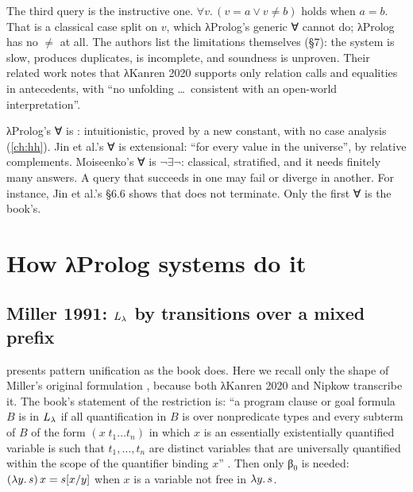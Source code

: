 \noindent The third query is the instructive one. $\forall v.\,(v=a\vee v\neq b)$ holds when $a=b$.
That is a classical case split on $v$, which λProlog's generic ∀ cannot do; λProlog has no $\neq$ at
all. The authors list the limitations themselves (§7): the system is slow, produces duplicates, is
incomplete, and soundness is unproven. Their related work notes that λKanren 2020 supports only
relation calls and equalities in antecedents, with \enquote{no unfolding \dots\ consistent with an
open-world interpretation}.

\begin{pitfall}
λProlog's ∀ is : intuitionistic, proved by a new constant, with no case analysis
(\cref{ch:hh}). Jin et al.'s ∀ is extensional: \enquote{for every value in the universe}, by relative
complements. Moiseenko's ∀ is $\neg\exists\neg$: classical, stratified, and it needs finitely many
answers. A query that succeeds in one may fail or diverge in another. For instance, Jin et al.'s §6.6
shows that  does not terminate. Only the
first ∀ is the book's.
\end{pitfall}

\section{How λProlog systems do it}\label{sec:lkanren-impl}

\subsection{Miller 1991: \texorpdfstring{$L_\lambda$}{L-lambda} by transitions over a mixed prefix}\label{sec:lkanren-miller}

 presents pattern unification as the book does. Here we recall only the shape of
Miller's original formulation \cite{Miller1991}, because both λKanren 2020 and Nipkow transcribe it.
The book's statement of the restriction is: \enquote{a program clause or goal formula $B$ is in
$L_\lambda$ if all quantification in $B$ is over nonpredicate types and every subterm of $B$ of the form
$(x\;t_1\dots t_n)$ in which $x$ is an essentially existentially quantified variable is such that
$t_1,\dots,t_n$ are distinct variables that are universally quantified within the scope of the
quantifier binding $x$} . Then only β$_0$ is needed: $(\lambda y.\,s)\,x=s[x/y]$ when $x$ is a
variable not free in $\lambda y.\,s$.

